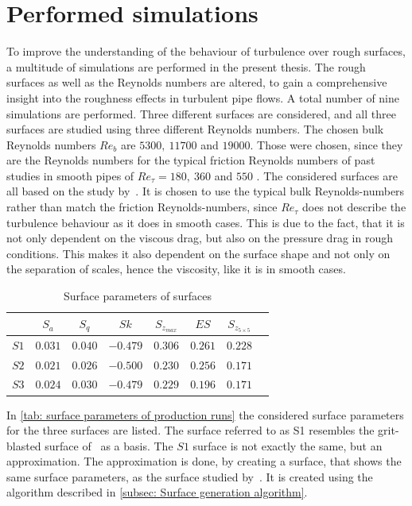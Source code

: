 \section{Performed simulations}\label{sec: performed simulations}
To improve the understanding of the behaviour of turbulence over rough surfaces, a multitude of simulations are performed in the present thesis.
The rough surfaces as well as the Reynolds numbers are altered, to gain a comprehensive insight into the roughness effects in turbulent pipe flows.
A total number of nine simulations are performed.
Three different surfaces are considered, and all three surfaces are studied using three different Reynolds numbers.
The chosen bulk Reynolds numbers $Re_b$ are $5300,\ 11700$ and $19000$.
Those were chosen, since they are the Reynolds numbers for the typical friction Reynolds numbers of past studies in smooth pipes of $Re_\tau = 180,\ 360$ and $550$ \citep{yaoDirectNumericalSimulations2023,elkhouryDirectNumericalSimulation2013,kimProgressPipeChannel2012}. 
The considered surfaces are all based on the study by~\cite{demaioDirectNumericalSimulation2023}.
It is chosen to use the typical bulk Reynolds-numbers rather than match the friction Reynolds-numbers, since $Re_\tau$ does not describe the turbulence behaviour as it does in smooth cases.
This is due to the fact, that it is not only dependent on the viscous drag, but also on the pressure drag in rough conditions.
This makes it also dependent on the surface shape and not only on the separation of scales, hence the viscosity, like it is in smooth cases.

\begin{table}
    \centering
    \begin{tabular}{c c c c c c c c}
        \hline
                & $S_a$     & $S_q$     & $Sk$      & $S_{z_{max}}$ & $ES$      & $S_{z_{5 \times 5}}$\\
        \hline
        $S1$    & $0.031$   & $0.040$   & $-0.479$  & $0.306$       & $0.261$   & $0.228$ \\
        $S2$    & $0.021$   & $0.026$   & $-0.500$  & $0.230$       & $0.256$   & $0.171$ \\
        $S3$   & $0.024$   & $0.030$   & $-0.479$  & $0.229$       & $0.196$   & $0.171$ \\
        \hline
    \end{tabular}
    \caption{Surface parameters of surfaces}
    \label{tab: surface parameters of production runs}
\end{table}
In \autoref{tab: surface parameters of production runs} the considered surface parameters for the three surfaces are listed.
The surface referred to as S1 resembles the grit-blasted surface of~\cite{demaioDirectNumericalSimulation2023} as a basis.
The $S1$ surface is not exactly the same, but an approximation.
The approximation is done, by creating a surface, that shows the same surface parameters, as the surface studied by~\cite{demaioDirectNumericalSimulation2023}.
It is created using the algorithm described in \autoref{subsec: Surface generation algorithm}.


